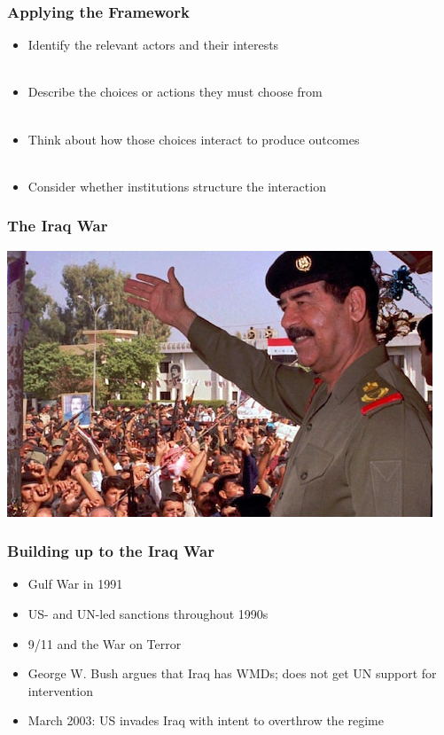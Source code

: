 \documentclass{beamer}
\begin{document}
\begin{frame} 
	\frametitle{\LARGE{Applying the Framework}}
	\begin{itemize}
		\item Identify the relevant actors and their interests \pause
		\\~\\ 
		\item Describe the choices or actions they must choose from \pause 
		\\~\\ 
		\item Think about how those choices interact to produce outcomes \pause 
		\\~\\ 
		\item Consider whether institutions structure the interaction
	\end{itemize}
\end{frame}

\begin{frame} 
	\frametitle{\LARGE{The Iraq War}}
	\centering
	\includegraphics[width=\textwidth,height=0.8\textheight,keepaspectratio]{Hussein.jpg}
\end{frame}

\begin{frame} 
	\frametitle{\LARGE{Building up to the Iraq War}}
	\begin{itemize}
		\item Gulf War in 1991
		\item US- and UN-led sanctions throughout 1990s
		\item 9/11 and the War on Terror
		\item George W. Bush argues that Iraq has WMDs; does not get UN support for intervention
		\item March 2003: US invades Iraq with intent to overthrow the regime
	\end{itemize}
\end{frame}
\end{document}
